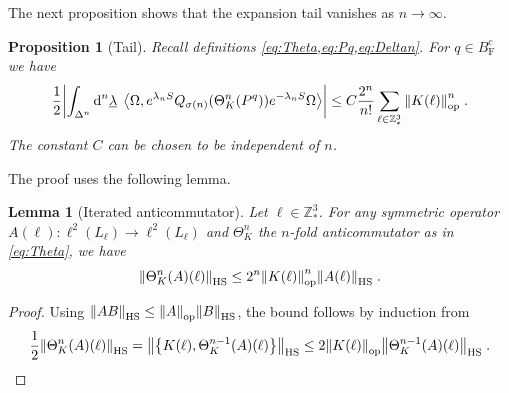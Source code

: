 \documentclass[12pt,a4paper]{article}
\numberwithin{equation}{section}
\newcommand{\1}{\mathbb{I}}
\newcommand{\di}{\textnormal{d}}
\newcommand{\F}{\mathrm{F}}
\newcommand{\HS}{\mathrm{HS}}
\newcommand{\Z}{\mathbb{Z}}
\newcommand{\half}{\frac{1}{2}}
\newcommand{\eva}[1]{\left\langle #1 \right\rangle}
\theoremstyle{plain}
\newtheorem{lemma}[theorem]{Lemma}
\newtheorem{proposition}[theorem]{Proposition}
\theoremstyle{definition}
\theoremstyle{remark}
\theoremstyle{plain}
\theoremstyle{definition}
\theoremstyle{remark}
\begin{document}
The next proposition shows that the expansion tail vanishes as $ n \to \infty $.
%
\begin{proposition}[Tail]\label{prop:headerr}
Recall definitions \cref{eq:Theta,eq:Pq,eq:Deltan}. For $q \in B^c_{\F}$ we have
\begin{equation}\label{eq:headest}
	\half \abs{\int_{\Delta^n} \di^n\underline{\lambda} \;
		\eva{\Omega, e^{\lambda_n S}Q_{\sigma(n)}(\Theta^n_{K}(P^q)) e^{-\lambda_n S} \Omega} }
	\leq C \frac{2^n}{n!} \sum_{\ell \in \Z^3_*} \norm{K(\ell)}^n_{\mathrm{op}} \;.
\end{equation}
The constant $C$ can be chosen to be independent of $n$.
\end{proposition}
%
The proof uses the following lemma.
%
\begin{lemma}[Iterated anticommutator]\label{lem:multicommest}
Let $ \ell \in \Z^3_* $. For any symmetric operator $ A(\ell): \ell^2(L_\ell) \to \ell^2(L_\ell) $ and $\Theta^n_K$ the $ n $-fold anticommutator as in \eqref{eq:Theta}, we have
\begin{equation}
	\norm{\Theta^{n}_K(A)(\ell)}_{\HS}
	\leq 2^n \norm{K(\ell)}^{n}_{\mathrm{op}}\norm{A(\ell)}_{\HS} \;.
\end{equation}
\end{lemma}
%
\begin{proof}
Using $\norm{AB}_{\HS} \leq \norm{A}_{\mathrm{op}} \norm{B}_{\HS}$, the bound follows by induction from
\[
	\half \norm{\Theta^{n}_K(A)(\ell)}_{\HS}
	= \norm{\left\{K(\ell),\Theta^{n-1}_K(A)(\ell)\right\}}_{\HS}
	\leq 2 \norm{K(\ell)}_{\mathrm{op}}\norm{\Theta^{n-1}_K(A)(\ell)}_{\HS} \;. \qedhere
\]
\end{proof}
\end{document}
